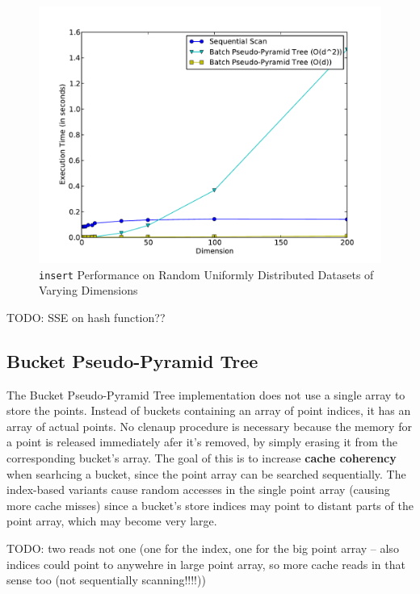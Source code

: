 \begin{figure}
	\centering
	\includegraphics[scale=0.5]{figures/performance_analysis/iteration_2/new_pseudo-pyramid_hash_performance.pdf}
	\caption{\texttt{insert} Performance on Random Uniformly Distributed Datasets of Varying Dimensions}
	\label{fig:new-pseudo-pyramid-hash}
\end{figure}

TODO: SSE on hash function??

\subsection{Bucket Pseudo-Pyramid Tree}

The Bucket Pseudo-Pyramid Tree implementation does not use a single array to store the points. Instead of buckets containing an array of point indices, it has an array of actual points. No clenaup procedure is necessary because the memory for a point is released immediately afer it's removed, by simply erasing it from the corresponding bucket's array. The goal of this is to increase \textbf{cache coherency} when searhcing a bucket, since the point array can be searched sequentially. The index-based variants cause random accesses in the single point array (causing more cache misses) since a bucket's store indices may point to distant parts of the point array, which may become very large.

TODO: two reads not one (one for the index, one for the big point array -- also indices could point to anywehre in large point array, so more cache reads in that sense too (not sequentially scanning!!!!))

